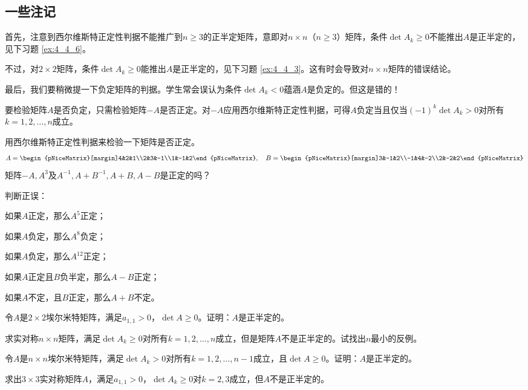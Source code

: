 \subsection{一些注记}

首先，注意到西尔维斯特正定性判据不能推广到$n\ge 3$的正半定矩阵，意即对$n\times n$（$n\ge 3$）矩阵，条件$\det A_k\ge 0$不能推出$A$是正半定的，见下习题 \ref{ex:4_4_6}。

不过，对$2\times 2$矩阵，条件$\det A_k\ge 0$能推出$A$是正半定的，见下习题 \ref{ex:4_4_3}。这有时会导致对$n\times n$矩阵的错误结论。

最后，我们要稍微提一下负定矩阵的判据。学生常会误认为条件$\det A_k< 0$蕴涵$A$是负定的。但这是错的！

要检验矩阵$A$是否负定，只需检验矩阵$-A$是否正定。对$-A$应用西尔维斯特正定性判据，可得$A$负定当且仅当$(-1)^k\det A_k>0$对所有$k=1,2,\dots,n$成立。

\begin{problemset}
  \item 用西尔维斯特正定性判据来检验一下矩阵是否正定。
  \[A=\begin{pNiceMatrix}[margin]4&2&1\\2&3&-1\\1&-1&2\end{pNiceMatrix},\quad B=\begin{pNiceMatrix}[margin]3&-1&2\\-1&4&-2\\2&-2&2\end{pNiceMatrix}\]
  矩阵$-A,A^3$及$A^{-1},A+B^{-1},A+B,A-B$是正定的吗？
  \item 判断正误：
  \begin{probenumerate}
    \item 如果$A$正定，那么$A^5$正定；
    \item 如果$A$负定，那么$A^8$负定；
    \item 如果$A$负定，那么$A^{12}$正定；
    \item 如果$A$正定且$B$负半定，那么$A-B$正定；
    \item 如果$A$不定，且$B$正定，那么$A+B$不定。
  \end{probenumerate}
  \item \label{ex:4_4_3} 令$A$是$2\times 2$埃尔米特矩阵，满足$a_{1,1}>0$，$\det A\ge 0$。证明：$A$是正半定的。
  \item 求实对称$n\times n$矩阵，满足$\det A_k\ge 0$对所有$k=1,2,\dots,n$成立，但是矩阵$A$不是正半定的。试找出$n$最小的反例。
  \item 令$A$是$n\times n$埃尔米特矩阵，满足$\det A_k> 0$对所有$k=1,2,\dots,n-1$成立，且$\det A\ge 0$。证明：$A$是正半定的。
  \item \label{ex:4_4_6} 求出$3\times 3$实对称矩阵$A$，满足$a_{1,1}>0$，$\det A_k\ge 0$对$k=2,3$成立，但$A$不是正半定的。
\end{problemset}

